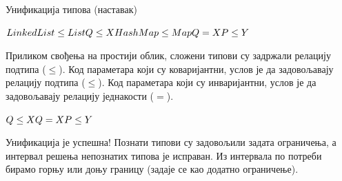 \documentclass[xcolor=table]{beamer}
\begin{document}
\begin{frame}[allowframebreaks]{Унификација типова (наставак)}
        \framebreak
        
        \begin{math}
LinkedList \leq List
\newline
Q \leq X
\newline
HashMap \leq Map
\newline
Q = X
\newline
P \leq Y
\newline
        \end{math}
        
        Приликом свођења на простији облик, сложени типови су задржали релацију подтипа (\begin{math}\leq\end{math}).
        \newline\newline
        Код параметара који су коваријантни, услов је да задовољавају релацију подтипа (\begin{math}\leq\end{math}).
        \newline\newline
        Код параметара који су инваријантни, услов је да задовољавају релацију једнакости (\begin{math}=\end{math}).
        
        \framebreak
        
        \begin{math}
Q \leq X
\newline
Q = X
\newline
P \leq Y
\newline
        \end{math}
        
        Унификација је успешна!
        \newline\newline
        Познати типови су задовољили задата ограничења, а интервал решења непознатих типова је исправан.
        \newline\newline
        Из интервала по потреби бирамо горњу или доњу границу (задаје се као додатно ограничење).
        
        \framebreak
        

\end{frame}
\end{document}
